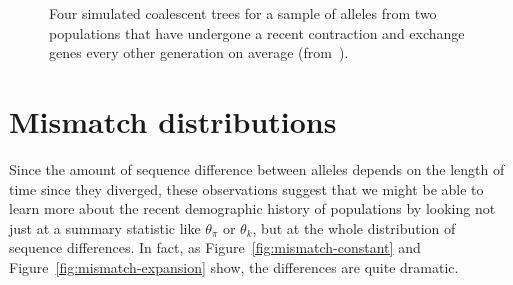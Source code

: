 \documentclass[12pt]{article}
\begin{document}
\begin{figure}
\begin{center}
\end{center}
\caption{Four simulated coalescent trees for a sample of alleles from
  two populations that have undergone a recent contraction and exchange
  genes every other generation on average
  (from~\cite{Harpending-etal-1998}).}\label{fig:coalescent-contraction} 
\end{figure}

\section*{Mismatch distributions}

Since the amount of sequence difference between alleles depends on the
length of time since they diverged, these observations suggest that we
might be able to learn more about the recent demographic history of
populations by looking not just at a summary statistic like
$\theta_\pi$ or $\theta_k$, but at the whole distribution of sequence
differences. In fact, as Figure~\ref{fig:mismatch-constant} and
Figure~\ref{fig:mismatch-expansion} show, the differences are quite
dramatic.
\end{document}
